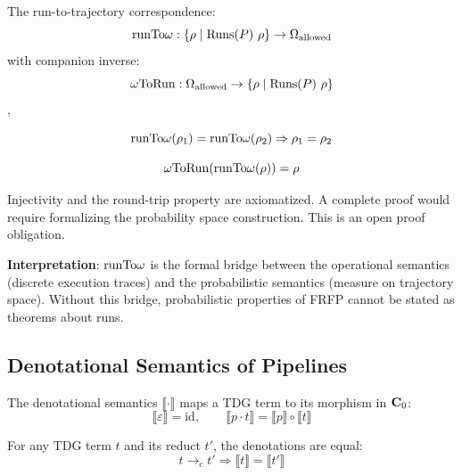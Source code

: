 \begin{definition}[$\runToOmega$]
The run-to-trajectory correspondence:
\[
  \runToOmega : \{\rho \mid \mathrm{Runs}(P)\ \rho\} \to \Omega_{\mathrm{allowed}}
\]
with companion inverse:
\[
  \omega\mathrm{ToRun} : \Omega_{\mathrm{allowed}} \to \{\rho \mid \mathrm{Runs}(P)\ \rho\}
\]
, 
\end{definition}

\begin{axiom_env}
\[
  \mathrm{runTo}\omega(\rho_1) = \mathrm{runTo}\omega(\rho_2) \Rightarrow \rho_1 = \rho_2
\]
\end{axiom_env}

\begin{axiom_env}
\[
  \omega\mathrm{ToRun}(\mathrm{runTo}\omega(\rho)) = \rho
\]
\end{axiom_env}

\begin{note}
Injectivity and the round-trip property are axiomatized. A complete proof would
require formalizing the probability space construction. This is an open proof
obligation.

\textbf{Interpretation}: $\runToOmega$ is the formal bridge between the
operational semantics (discrete execution traces) and the probabilistic semantics
(measure on trajectory space). Without this bridge, probabilistic properties of
FRFP cannot be stated as theorems about runs.
\end{note}

\subsection{Denotational Semantics of Pipelines}

\begin{definition}
The denotational semantics $\llbracket \cdot \rrbracket$ maps a TDG term to its
morphism in $\mathbf{C}_0$:
\[
  \llbracket \varepsilon \rrbracket = \mathrm{id},\qquad
  \llbracket p \cdot t \rrbracket = \llbracket p \rrbracket \circ \llbracket t \rrbracket
\]
\end{definition}

\begin{theorem}
For any TDG term $t$ and its reduct $t'$, the denotations are equal:
\[
  t \to_c t' \Rightarrow \llbracket t \rrbracket = \llbracket t' \rrbracket
\]
\end{theorem}


